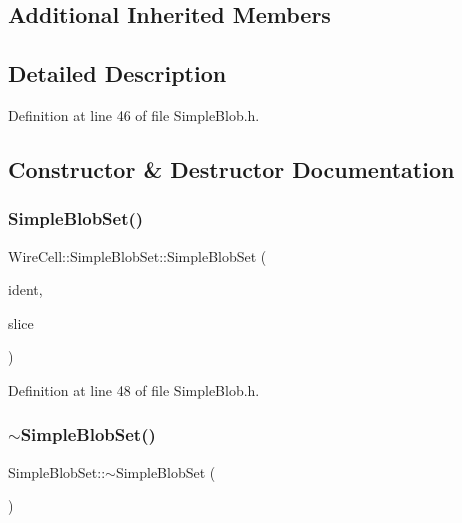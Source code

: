 \subsection*{Additional Inherited Members}


\subsection{Detailed Description}


Definition at line 46 of file Simple\+Blob.\+h.



\subsection{Constructor \& Destructor Documentation}
\mbox{\label{class_wire_cell_1_1_simple_blob_set_a5ec82acf45228fe08c9e0535a06cd6fb}} 
\subsubsection{\texorpdfstring{Simple\+Blob\+Set()}{SimpleBlobSet()}}
{\footnotesize\ttfamily Wire\+Cell\+::\+Simple\+Blob\+Set\+::\+Simple\+Blob\+Set (\begin{DoxyParamCaption}\item[{int}]{ident,  }\item[{const \hyperlink{class_wire_cell_1_1_i_data_aff870b3ae8333cf9265941eef62498bc}{I\+Slice\+::pointer} \&}]{slice }\end{DoxyParamCaption})\hspace{0.3cm}{\ttfamily [inline]}}



Definition at line 48 of file Simple\+Blob.\+h.

\mbox{\label{class_wire_cell_1_1_simple_blob_set_a8b579ecc8da7c59bac25fbfa4e2cd8b5}} 
\subsubsection{\texorpdfstring{$\sim$\+Simple\+Blob\+Set()}{~SimpleBlobSet()}}
{\footnotesize\ttfamily Simple\+Blob\+Set\+::$\sim$\+Simple\+Blob\+Set (\begin{DoxyParamCaption}{ }\end{DoxyParamCaption})\hspace{0.3cm}{\ttfamily [virtual]}}



